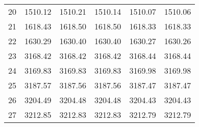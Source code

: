 \documentclass[10pt,oneside]{article}
\begin{document}
\begin{table}[h!]
\begin{tabular}{cccccc}
20 &   1510.12 & 1510.21 &    1510.14 & 1510.07 &   1510.06 \\
21 &   1618.43 & 1618.50 &    1618.50 & 1618.33 &   1618.33 \\
22 &   1630.29 & 1630.40 &    1630.40 & 1630.27 &   1630.26 \\
23 &   3168.42 & 3168.42 &    3168.42 & 3168.44 &   3168.44 \\
24 &   3169.83 & 3169.83 &    3169.83 & 3169.98 &   3169.98 \\
25 &   3187.57 & 3187.56 &    3187.56 & 3187.47 &   3187.47 \\
26 &   3204.49 & 3204.48 &    3204.48 & 3204.43 &   3204.43 \\
27 &   3212.85 & 3212.83 &    3212.83 & 3212.79 &   3212.79 \\
\bottomrule
\end{tabular}
\end{table}
\end{document}
